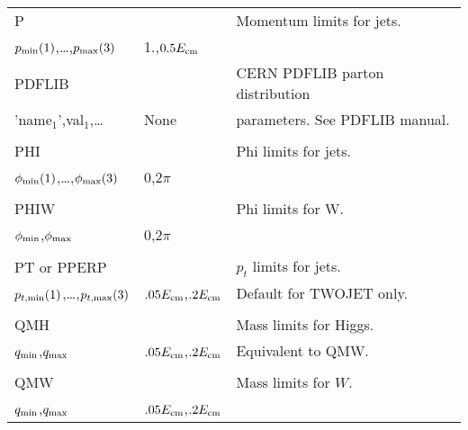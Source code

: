 \newpage
\begin{center}
\begin{tabular}{lll}
\hline\hline
P                      &                   & Momentum limits for jets.      \\
$p_{\rm min}(1)$,\dots,$p_{\rm max}(3)$ & 
1.,$0.5E_{\rm cm}$                         &                                \\

PDFLIB                 &                   & CERN PDFLIB parton distribution\\
'name$_1$',val$_1$,\dots & None            & parameters. See PDFLIB manual. \\
                       &                   &                                \\
PHI                    &                   & Phi limits for jets.           \\
$\phi_{\rm min}(1)$,\dots,$\phi_{\rm max}(3)$ & 0,$2\pi$ &                  \\
                       &                   &                                \\
PHIW                   &                   & Phi limits for W.              \\
$\phi_{\rm min}$,$\phi_{\rm max}$ & 
0,$2\pi$                                   &                                \\
                       &                   &                                \\
PT or PPERP            &                   & $p_t$ limits for jets.         \\
$p_{t,{\rm min}}(1)$,\dots,$p_{t,{\rm max}}(3)$  & 
$.05E_{\rm cm}$,$.2E_{\rm cm}$             & Default for TWOJET only.       \\
                       &                   &                                \\
QMH                    &                   & Mass limits for Higgs.         \\
$q_{\rm min}$,$q_{\rm max}$ & 
$.05E_{\rm cm}$,$.2E_{\rm cm}$             & Equivalent to QMW.             \\
                       &                   &                                \\
QMW                    &                   & Mass limits for $W$.           \\
$q_{\rm min}$,$q_{\rm max}$ & 
$.05E_{\rm cm}$,$.2E_{\rm cm}$             &                                \\

\end{tabular}
\end{center}

